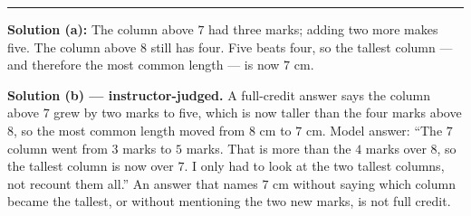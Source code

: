 \documentclass[12pt]{article}
\begin{document}
\vspace{0.15cm}\noindent\rule{\linewidth}{0.2pt}


\textbf{Solution (a):} The column above $7$ had three marks; adding two more makes five. The column
above $8$ still has four. Five beats four, so the tallest column --- and therefore the most common
length --- is now $7$ cm. 

\textbf{Solution (b) --- instructor-judged.} A full-credit answer says the column above $7$ grew by two
marks to five, which is now taller than the four marks above $8$, so the most common length moved
from $8$ cm to $7$ cm. Model answer: ``The $7$ column went from $3$ marks to $5$ marks. That is more
than the $4$ marks over $8$, so the tallest column is now over $7$. I only had to look at the two
tallest columns, not recount them all.'' An answer that names $7$ cm without saying which column
became the tallest, or without mentioning the two new marks, is not full credit.
\end{document}
